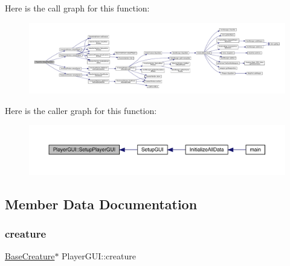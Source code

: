 Here is the call graph for this function\+:
\nopagebreak
\begin{figure}[H]
\begin{center}
\leavevmode
\includegraphics[width=350pt]{db/dcd/class_player_g_u_i_a7fdc3f6f9478ea077ddaffd8d34a3854_cgraph}
\end{center}
\end{figure}
Here is the caller graph for this function\+:
\nopagebreak
\begin{figure}[H]
\begin{center}
\leavevmode
\includegraphics[width=350pt]{db/dcd/class_player_g_u_i_a7fdc3f6f9478ea077ddaffd8d34a3854_icgraph}
\end{center}
\end{figure}


\subsection{Member Data Documentation}
\mbox{\label{class_player_g_u_i_a5916020676df5617cf1d3c9942dd6172}} 
\subsubsection{\texorpdfstring{creature}{creature}}
{\footnotesize\ttfamily \mbox{\hyperlink{class_base_creature}{Base\+Creature}}$\ast$ Player\+G\+U\+I\+::creature\hspace{0.3cm}{\ttfamily [private]}}

\mbox{\label{class_player_g_u_i_a25828c4b259c6d9544b165e86381edad}} 
